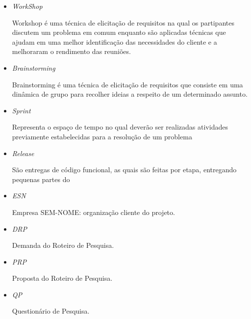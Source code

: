 \begin{itemize}
 
	\item \textit{WorkShop}

		 Workshop é uma técnica de elicitação de requisitos na qual os partipantes discutem um problema em comum enquanto são aplicadas técnicas que ajudam em uma melhor identificação das necessidades do cliente e a melhoraram o rendimento das reuniões.

	\item \textit{Brainstorming}

		 Brainstorming é uma técnica de elicitação de requisitos que consiste em uma dinâmica de grupo para recolher ideias a respeito de um determinado assunto.

	\item \textit{Sprint}

		Representa o espaço de tempo no qual deverão ser realizadas atividades previamente estabelecidas para a resolução de um problema %

	\item \textit{Release}

		São entregas de código funcional, as quais são feitas por etapa, entregando pequenas partes do \sw~ %

	\item \textit{ESN}

		Empresa SEM-NOME: organização cliente do projeto.

	\item \textit{DRP}

		Demanda do Roteiro de Pesquisa.

	\item \textit{PRP}

		Proposta do Roteiro de Pesquisa.

	\item \textit{QP}

		Questionário de Pesquisa.

\end{itemize}